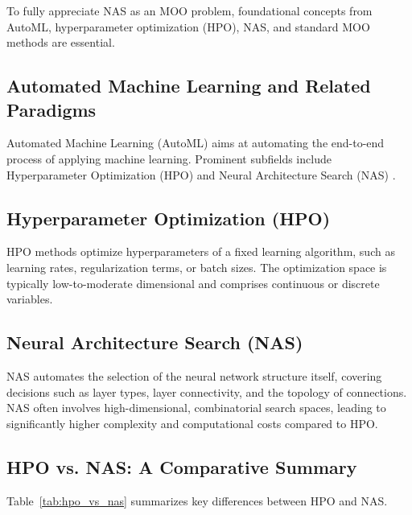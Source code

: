 \documentclass[11pt,a4paper]{article}
\begin{document}
	To fully appreciate NAS as an MOO problem, foundational concepts from AutoML, hyperparameter optimization (HPO), NAS, and standard MOO methods are essential.
	
	\subsection{Automated Machine Learning and Related Paradigms}
	
	Automated Machine Learning (AutoML) aims at automating the end-to-end process of applying machine learning. Prominent subfields include Hyperparameter Optimization (HPO) and Neural Architecture Search (NAS) \cite{Baratchi2024Survey}.
	
	\subsection{Hyperparameter Optimization (HPO)}
	
	HPO methods optimize hyperparameters of a fixed learning algorithm, such as learning rates, regularization terms, or batch sizes. The optimization space is typically low-to-moderate dimensional and comprises continuous or discrete variables.
	
	\subsection{Neural Architecture Search (NAS)}
	
	NAS automates the selection of the neural network structure itself, covering decisions such as layer types, layer connectivity, and the topology of connections. NAS often involves high-dimensional, combinatorial search spaces, leading to significantly higher complexity and computational costs compared to HPO.
	
	\subsection{HPO vs. NAS: A Comparative Summary}
	
	Table~\ref{tab:hpo_vs_nas} summarizes key differences between HPO and NAS.
	
\end{document}
